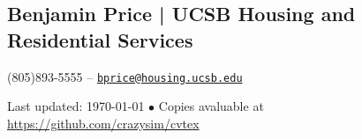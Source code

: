 \documentclass[10pt, letter]{article}
\newcommand{\reference}[4]{
\subsection*{#1 | {\footnotesize{#2}}}
#3 -- \href{mailto:#4}{\texttt{#4}}
}
\begin{document}
\begin{multicols}{2}
\reference{Benjamin Price}{UCSB Housing and Residential Services}
{(805)893-5555}{bprice@housing.ucsb.edu}




\end{multicols}

\begin{center}
{\scriptsize  Last updated: \today\- $\bullet$\- 
Copies avaluable at \href{https://github.com/crazysim/cvtex}{https://github.com/crazysim/cvtex}}
\end{center}
\end{document}
